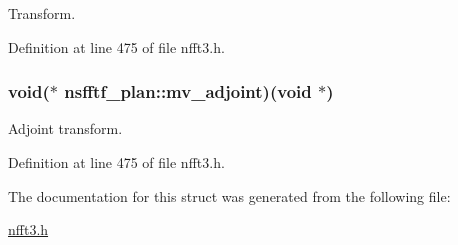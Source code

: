 Transform. 



Definition at line 475 of file nfft3.\-h.

\hypertarget{structnsfftf__plan_a8b4c8c903e7b24610e2d2e0c9bb62705}{
\subsubsection[{mv\-\_\-adjoint}]{\setlength{\rightskip}{0pt plus 5cm}void($\ast$ nsfftf\-\_\-plan\-::mv\-\_\-adjoint)(void $\ast$)}}\label{structnsfftf__plan_a8b4c8c903e7b24610e2d2e0c9bb62705}


Adjoint transform. 



Definition at line 475 of file nfft3.\-h.



The documentation for this struct was generated from the following file\-:\begin{DoxyCompactItemize}
\item 
\hyperlink{nfft3_8h}{nfft3.\-h}\end{DoxyCompactItemize}
